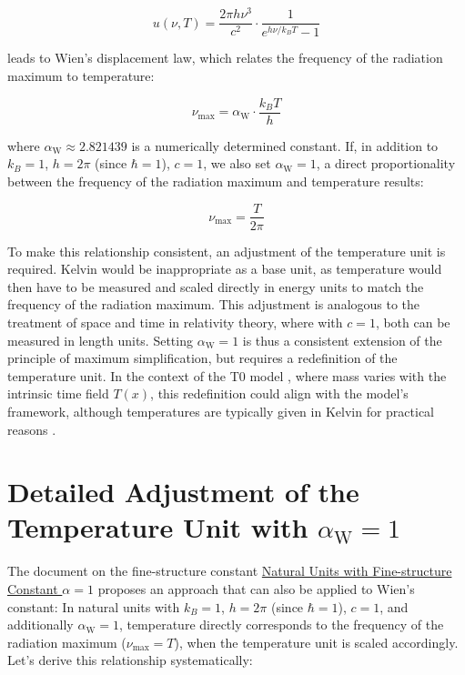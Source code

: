 \documentclass[12pt,a4paper]{article}
\newcommand{\Tfield}{T(x)}
\newcommand{\alphaW}{\alpha_{\text{W}}}
\begin{document}
	\begin{equation}
		u(\nu, T) = \frac{2\pi h \nu^3}{c^2} \cdot \frac{1}{e^{h \nu / k_B T} - 1}
	\end{equation}
	
	leads to Wien's displacement law, which relates the frequency of the radiation maximum to temperature:
	
	\begin{equation}
		\nu_{\text{max}} = \alphaW \cdot \frac{k_B T}{h}
	\end{equation}
	
	where \(\alphaW \approx 2.821439\) is a numerically determined constant. If, in addition to \(k_B = 1\), \(h = 2\pi\) (since \(\hbar = 1\)), \(c = 1\), we also set \(\alphaW = 1\), a direct proportionality between the frequency of the radiation maximum and temperature results:
	
	\begin{equation}
		\nu_{\text{max}} = \frac{T}{2\pi}
	\end{equation}
	
	To make this relationship consistent, an adjustment of the temperature unit is required. Kelvin would be inappropriate as a base unit, as temperature would then have to be measured and scaled directly in energy units to match the frequency of the radiation maximum. This adjustment is analogous to the treatment of space and time in relativity theory, where with \(c = 1\), both can be measured in length units. Setting \(\alphaW = 1\) is thus a consistent extension of the principle of maximum simplification, but requires a redefinition of the temperature unit. In the context of the T0 model \cite{pascher_galaxies_2025}, where mass varies with the intrinsic time field \(\Tfield\), this redefinition could align with the model's framework, although temperatures are typically given in Kelvin for practical reasons \cite{pascher_messdifferenzen_2025}.
	
	\section{Detailed Adjustment of the Temperature Unit with \(\alphaW = 1\)}
	\label{sec:detailed_adjustment}
	
	The document on the fine-structure constant \href{https://github.com/jpascher/T0-Time-Mass-Duality/tree/main/2/pdf/English/NatEinheitenAlpha1En.pdf}{Natural Units with Fine-structure Constant \(\alpha = 1\)} \cite{pascher_alpha_2025} proposes an approach that can also be applied to Wien's constant: In natural units with \(k_B = 1\), \(h = 2\pi\) (since \(\hbar = 1\)), \(c = 1\), and additionally \(\alphaW = 1\), temperature directly corresponds to the frequency of the radiation maximum (\(\nu_{\text{max}} = T\)), when the temperature unit is scaled accordingly. Let's derive this relationship systematically:
	
\end{document}
